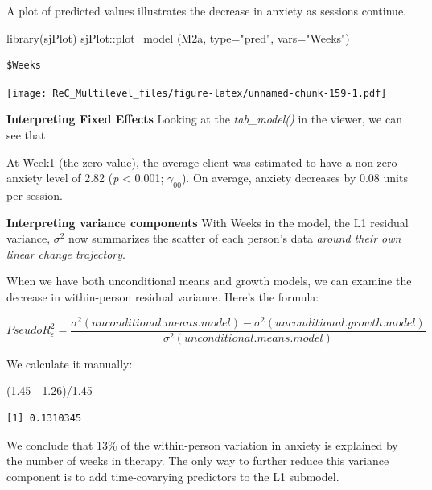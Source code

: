 \documentclass[
  11pt,
]{book}
\newenvironment{Shaded}{\begin{snugshade}}{\end{snugshade}}
\newcommand{\AttributeTok}[1]{\textcolor[rgb]{0.77,0.63,0.00}{#1}}
\newcommand{\FloatTok}[1]{\textcolor[rgb]{0.00,0.00,0.81}{#1}}
\newcommand{\FunctionTok}[1]{\textcolor[rgb]{0.00,0.00,0.00}{#1}}
\newcommand{\NormalTok}[1]{#1}
\newcommand{\SpecialCharTok}[1]{\textcolor[rgb]{0.00,0.00,0.00}{#1}}
\newcommand{\StringTok}[1]{\textcolor[rgb]{0.31,0.60,0.02}{#1}}
\begin{document}
A plot of predicted values illustrates the decrease in anxiety as sessions continue.

\begin{Shaded}
\begin{Highlighting}[]
\FunctionTok{library}\NormalTok{(sjPlot)}
\NormalTok{sjPlot}\SpecialCharTok{::}\FunctionTok{plot\_model}\NormalTok{ (M2a, }\AttributeTok{type=}\StringTok{"pred"}\NormalTok{, }\AttributeTok{vars=}\StringTok{"Weeks"}\NormalTok{)}
\end{Highlighting}
\end{Shaded}

\begin{verbatim}
$Weeks
\end{verbatim}

\texttt{[image: ReC\_Multilevel\_files/figure-latex/unnamed-chunk-159-1.pdf]}

\textbf{Interpreting Fixed Effects}
Looking at the \emph{tab\_model()} in the viewer, we can see that

At Week1 (the zero value), the average client was estimated to have a non-zero anxiety level of 2.82 (\emph{p} \textless{} 0.001; \(\gamma _{00}\)). On average, anxiety decreases by 0.08 units per session.

\textbf{Interpreting variance components}
With Weeks in the model, the L1 residual variance, \(\sigma^{2}\) now summarizes the scatter of each person's data \emph{around their own linear change trajectory}.

When we have both unconditional means and growth models, we can examine the decrease in within-person residual variance. Here's the formula:

\[Pseudo R_{\varepsilon }^{2} = \frac{\sigma^{2}(unconditional. means. model) - \sigma^{2}(unconditional. growth. model)}{\sigma ^{2}(unconditional. means. model)}\]

We calculate it manually:

\begin{Shaded}
\begin{Highlighting}[]
\NormalTok{(}\FloatTok{1.45} \SpecialCharTok{{-}} \FloatTok{1.26}\NormalTok{)}\SpecialCharTok{/}\FloatTok{1.45}
\end{Highlighting}
\end{Shaded}

\begin{verbatim}
[1] 0.1310345
\end{verbatim}

We conclude that 13\% of the within-person variation in anxiety is explained by the number of weeks in therapy. The only way to further reduce this variance component is to add time-covarying predictors to the L1 submodel.
\end{document}
